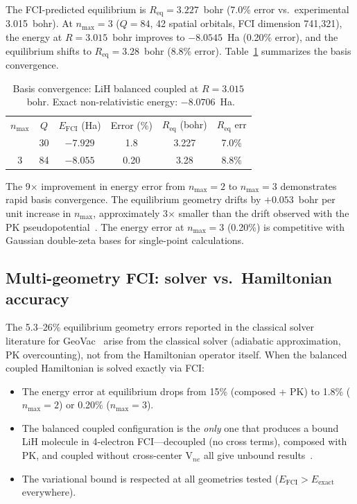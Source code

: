 \documentclass[twocolumn,pra,amsmath,amssymb,superscriptaddress]{revtex4-2}
\begin{document}
The FCI-predicted equilibrium is $R_{\text{eq}} = 3.227$~bohr
(7.0\% error vs.\ experimental 3.015~bohr). At $n_{\max}=3$
($Q=84$, 42 spatial orbitals, FCI dimension 741{,}321), the energy
at $R=3.015$~bohr improves to $-8.0545$~Ha (0.20\% error), and
the equilibrium shifts to $R_{\text{eq}} = 3.28$~bohr (8.8\% error).
Table~\ref{tab:convergence} summarizes the basis convergence.

\begin{table}[h]
\caption{Basis convergence: LiH balanced coupled at $R=3.015$~bohr.
  Exact non-relativistic energy: $-8.0706$~Ha.}
\label{tab:convergence}
\begin{ruledtabular}
\begin{tabular}{cccccc}
$n_{\max}$ & $Q$ & $E_{\text{FCI}}$ (Ha) & Error (\%) & $R_{\text{eq}}$ (bohr) & $R_{\text{eq}}$ err \\
\colrule
2 & 30  & $-7.929$ & 1.8 & 3.227 & 7.0\% \\
3 & 84  & $-8.055$ & 0.20 & 3.28 & 8.8\% \\
\end{tabular}
\end{ruledtabular}
\end{table}

The 9$\times$ improvement in energy error from $n_{\max}=2$ to
$n_{\max}=3$ demonstrates rapid basis convergence. The equilibrium
geometry drifts by $+0.053$~bohr per unit increase in $n_{\max}$,
approximately 3$\times$ smaller than the drift observed with the
PK pseudopotential~\cite{GeoVac_Paper19}. The energy error at
$n_{\max}=3$ (0.20\%) is competitive with Gaussian double-zeta
bases for single-point calculations.

\subsection{Multi-geometry FCI: solver vs.\ Hamiltonian accuracy}

The 5.3--26\% equilibrium geometry errors reported in the classical
solver literature for GeoVac~\cite{GeoVac_Paper17} arise from the
classical solver (adiabatic approximation, PK overcounting), not from
the Hamiltonian operator itself. When the balanced coupled Hamiltonian
is solved exactly via FCI:

\begin{itemize}
\item The energy error at equilibrium drops from 15\% (composed + PK)
  to 1.8\% ($n_{\max}=2$) or 0.20\% ($n_{\max}=3$).
\item The balanced coupled configuration is the \emph{only} one that
  produces a bound LiH molecule in 4-electron FCI---decoupled (no
  cross terms), composed with PK, and coupled without cross-center
  V$_{ne}$ all give unbound results~\cite{GeoVac_Paper19}.
\item The variational bound is respected at all geometries tested
  ($E_{\text{FCI}} > E_{\text{exact}}$ everywhere).
\end{itemize}
\end{document}
